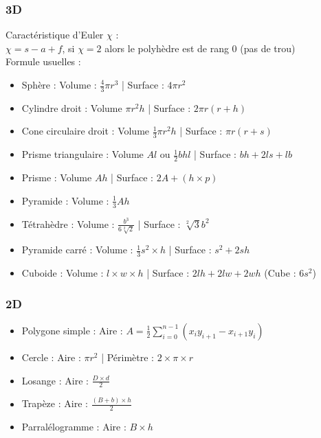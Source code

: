 \documentclass[8pt]{article}
\begin{document}
            \subsubsection{3D}
            Caractéristique d'Euler $\chi$ : \\
            $\chi = s-a+f$, si $\chi = 2$ alors le polyhèdre est de rang 0 (pas de trou)\\
            Formule usuelles :
            \begin{itemize}
                \item Sphère : Volume : $\frac{4}{3}\pi r^{3}$ | Surface : $4\pi r^{2}$
                \item Cylindre droit : Volume $\pi r^{2} h$ | Surface : $2\pi r( r + h)$
                \item Cone circulaire droit : Volume $\frac{1}{3} \pi r^{2} h$ | Surface : $\pi r( r + s)$
                \item Prisme triangulaire : Volume $A  l$ ou $\frac{1}{2}bhl$ | Surface : $bh + 2ls + lb$
                \item Prisme : Volume $Ah$ | Surface : $2A + (h \times p)$
                \item Pyramide : Volume : $\frac{1}{3}Ah$
                \item Tétrahèdre : Volume : $\frac{b^{3}}{6  \sqrt[2]{2}}$ | Surface : $\sqrt[2]{3}b^{2}$
                \item Pyramide carré : Volume : $\frac{1}{3}s^{2}\times h$ | Surface : $s^{2} + 2sh$
                \item Cuboide : Volume : $l\times w \times h$ | Surface : $2lh + 2lw +2wh$ (Cube : $6s^{2}$)
            \end{itemize}
            \subsubsection{2D}
            \begin{itemize}
                \item Polygone simple : Aire : $A = \frac{1}{2} \sum_{i=0}^{n-1}\left(x_{i}y_{i+1} - x_{i+1}y_{i}\right)$
                \item Cercle : Aire : $\pi r^{2}$ | Périmètre : $2\times \pi \times r$
                \item Losange : Aire : $\frac{D\times d}{2}$
                \item Trapèze : Aire : $\frac{(B+b)\times h}{2}$
                \item Parralélogramme : Aire : $B\times h$
            \end{itemize}
\end{document}
